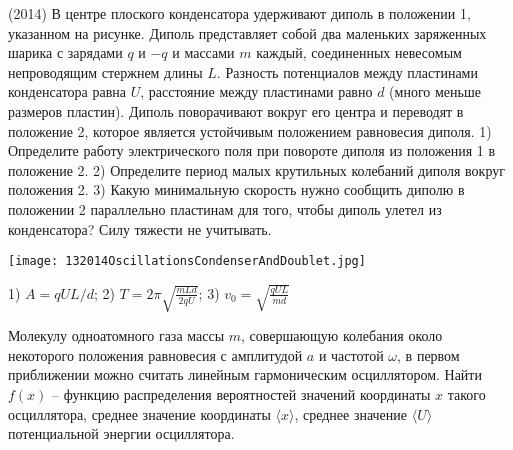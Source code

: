 \begin{ex}
(2014) В центре плоского конденсатора удерживают диполь в положении 1, указанном на рисунке. 
Диполь представляет собой два маленьких заряженных шарика с зарядами $q$ и $-q$ и массами $m$ каждый, 
соединенных невесомым непроводящим стержнем длины $L$. Разность потенциалов между пластинами конденсатора равна $U$, 
расстояние между пластинами равно $d$ (много меньше размеров пластин). Диполь поворачивают вокруг его центра и переводят в положение 2, 
которое является устойчивым положением равновесия диполя. 
1) Определите работу электрического поля при повороте диполя из положения 1 в положение 2. 
2) Определите период малых крутильных колебаний диполя вокруг положения 2. 
3) Какую минимальную скорость нужно сообщить диполю в положении 2 параллельно пластинам для того, чтобы диполь улетел из конденсатора? 
Силу тяжести не учитывать.
\begin{center}
\texttt{[image: 132014OscillationsCondenserAndDoublet.jpg]}
\end{center}
\begin{ans}
1) $A=qUL/d$; 2) $T=2\pi\sqrt{\frac{mLd}{2qU}}$; 3) $v_0 = \sqrt{\frac{qUL}{md }}$
\end{ans}
\end{ex}

\begin{ex}
Молекулу одноатомного газа массы $m$, совершающую колебания около некоторого положения равновесия с амплитудой $a$ и частотой $\omega$, 
в первом приближении можно считать линейным гармоническим осциллятором. 
Найти $f(x)$ -- функцию распределения вероятностей значений координаты $x$ такого осциллятора, среднее значение координаты $\langle x \rangle$, 
среднее значение $\langle U \rangle$ потенциальной энергии осциллятора.
\begin{ans}
\end{ans}
\end{ex}
